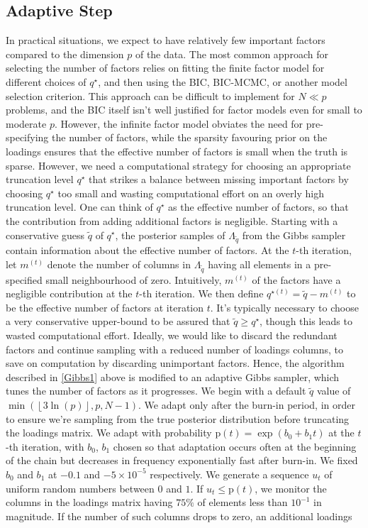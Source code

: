 \documentclass[a4paper,12pt,fleqn]{article}
\numberwithin{equation}{section}
\begin{document}
\subsection[Adaptive Step]{Adaptive Step}
\label{Adapt_Section}
In practical situations, we expect to have relatively few important factors compared to the dimension $p$ of the data. The most common approach for selecting the number of factors relies on fitting the finite factor model for different choices of $q^\star$, and then using the BIC, BIC-MCMC, or another model selection criterion. This approach can be difficult to implement for $N \ll p$ problems, and the BIC itself isn't well justified for factor models even for small to moderate $p$. However, the infinite factor model obviates the need for pre-specifying the number of factors, while the sparsity favouring prior on the loadings ensures that the effective number of factors is small when the truth is sparse. However, we need a computational strategy for choosing an appropriate truncation level $q^\star$ that strikes a balance between missing important factors by choosing $q^\star$ too small and wasting computational effort on an overly high truncation level. One can think of $q^\star$ as the effective number of factors, so that the contribution from adding additional factors is negligible. Starting with a conservative guess $\tilde{q}$ of $q^\star$, the posterior samples of $\Lambda_{\tilde{q}}$ from the Gibbs sampler contain information about the effective number of factors. At the $t$-th iteration, let $m^{\left(t\right)}$ denote the number of columns in $\Lambda_{\tilde{q}}$ having all elements in a pre-specified small neighbourhood of zero. Intuitively, $m^{\left(t\right)}$ of the factors have a negligible contribution at the $t$-th iteration. We then define $q^{\star\left(t\right)} = \tilde{q} - m^{\left(t\right)}$ to be the effective number of factors at iteration $t$. It's typically necessary to choose a very conservative upper-bound to be assured that $\tilde{q} \geq q^\star$, though this leads to wasted computational effort. Ideally, we would like to discard the redundant factors and continue sampling with a reduced number of loadings columns, to save on computation by discarding unimportant factors. Hence, the algorithm described in \ref{Gibbs1} above is modified to an adaptive Gibbs sampler, which tunes the number of factors as it progresses. We begin with a default $\tilde{q}$ value of $\min\left(\left\lfloor 3\ln(p)\right\rfloor, p, N-1\right)$. We adapt only after the burn-in period, in order to ensure we're sampling from the true posterior distribution before truncating the loadings matrix. We adapt with probability $\mathrm{p}\left(t\right) = \exp\left(b_0 + b_1t\right)$ at the $t$-th iteration, with $b_0$, $b_1$ chosen so that adaptation occurs often at the beginning of the chain but decreases in frequency exponentially fast after burn-in. We fixed $b_0$ and $b_1$ at $-0.1$ and $-5 \times 10^{-5}$ respectively. We generate a sequence $u_t$ of uniform random numbers between $0$ and $1$. If $u_t \leq \mathrm{p}\left(t\right)$, we monitor the columns in the loadings matrix having $75\%$ of elements less than $10^{-1}$ in magnitude. If the number of such columns drops to zero, an additional loadings 
\end{document}
